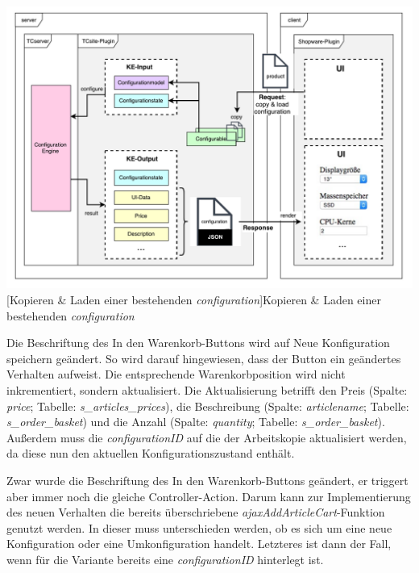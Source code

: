 \documentclass[11pt, a4paper, titlepage, listof=totoc, bibliography=totoc, index=totoc, twoside, openright, headings=normal]{scrreprt}
\begin{document}
\vspace{1em}
\begin{minipage}{\linewidth}
	\centering
	\includegraphics[width=1\linewidth]{Abbildungen/konzeptCopy.pdf}
	[Kopieren \& Laden einer bestehenden \emph{configuration}]{Kopieren \& Laden einer bestehenden \emph{configuration}}
	\label{fig:konzeptCopy}
\end{minipage}
\vspace{0.3em}

Die Beschriftung des \glqq In den Warenkorb\grqq{}-Buttons wird auf \glqq Neue Konfiguration speichern\grqq{} geändert. So wird darauf hingewiesen, dass der Button ein geändertes Verhalten aufweist. Die entsprechende Warenkorbposition wird nicht inkrementiert, sondern aktualisiert. Die Aktualisierung betrifft den Preis (Spalte: \emph{price}; Tabelle: \emph{s\_articles\_prices}), die Beschreibung (Spalte: \emph{articlename}; Tabelle: \emph{s\_order\_basket}) und die Anzahl (Spalte: \emph{quantity}; Tabelle: \emph{s\_order\_basket}). Außerdem muss die \emph{configurationID} auf die der Arbeitskopie aktualisiert werden, da diese nun den aktuellen Konfigurationszustand enthält.

Zwar wurde die Beschriftung des \glqq In den Warenkorb\grqq{}-Buttons geändert, er triggert aber immer noch die gleiche Controller-Action. Darum kann zur Implementierung des neuen Verhalten die bereits überschriebene \emph{ajaxAddArticleCart}-Funktion genutzt werden. In dieser muss unterschieden werden, ob es sich um eine neue Konfiguration oder eine Umkonfiguration handelt. Letzteres ist dann der Fall, wenn für die Variante bereits eine \emph{configurationID} hinterlegt ist.
\end{document}
